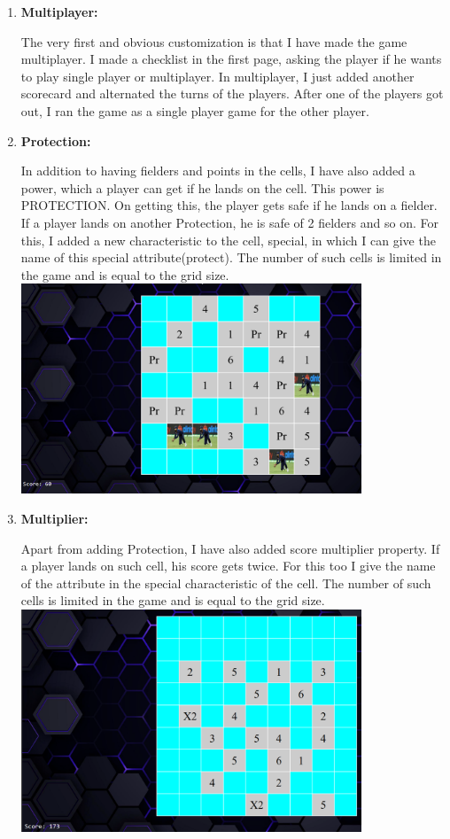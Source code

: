 \documentclass{article}
\begin{document}
\begin{enumerate}
    \item \textbf{Multiplayer:}
    
    The very first and obvious customization is that I have made the game multiplayer. I made a checklist in the first page, asking the player if he wants to play single player or multiplayer. In multiplayer, I just added another scorecard and alternated the turns of the players. After one of the players got out, I ran the game as a single player game for the other player.

    \item \textbf{Protection:}
    
    In addition to having fielders and points in the cells, I have also added a power, which a player can get if he lands on the cell. This power is PROTECTION. On getting this, the player gets safe if he lands on a fielder. If a player lands on another Protection, he is safe of 2 fielders and so on. For this, I added a new characteristic to the cell, special, in which I can give the name of this special attribute(protect). The number of such cells is limited in the game and is equal to the grid size.
    \includegraphics[width=0.8\textwidth]{image2.png}
    
    \item \textbf{Multiplier:}
    
    Apart from adding Protection, I have also added score multiplier property. If a player lands on such cell, his score gets twice. For this too I give the name of the attribute in the special characteristic of the cell. The number of such cells is limited in the game and is equal to the grid size.
    \includegraphics[width=0.8\textwidth]{image3.png}
    
\end{enumerate}
\end{document}
